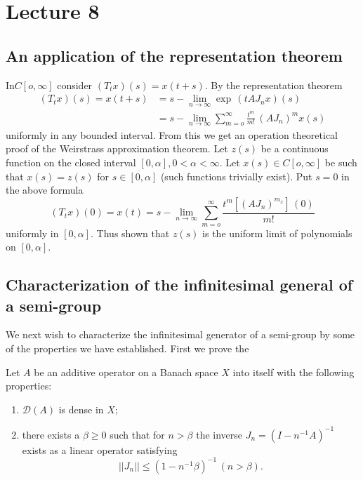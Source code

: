 \chapter{Lecture 8}\label{chap8} %

\section{An application of the representation theorem}\label{chap8:sec1}

In\pageoriginale $C[o, \infty]$ consider $(T_t x)(s)=x(t+s)$. By the representation
theorem 
\begin{align*}
 (T_t x) (s)= x(t+s) &= s-\lim_{n \to \infty} \exp \,(t A J_nx) (s)\\
 & =s-\lim_ {n \to \infty} \sum_{m =o}^\infty \frac{t^m}{m!} \,(A J_n)^m x(s)
\end{align*}
uniformly in any bounded interval. From this we get an operation
theoretical proof of the Weirstrass approximation theorem. Let $z(s)$
be a continuous function on the closed interval $[0, \alpha ],0 <
\alpha < \infty$. Let $x(s) \in C[o, \infty]$ be such that
$x(s)=z(s)$ for $s \in [0, \alpha]$ (such functions trivially
exist). Put $s=0$ in the above formula 
$$
(T_t x) (0)=x(t) = s-\lim_{n \to \infty} \sum_{m=o}^\infty \frac{t^m
 \left[(AJ_n)^{m_x}\right]\,(0)}{m!} 
$$
uniformly in $[0, \alpha]$. Thus shown that $z(s)$ is the uniform
limit of polynomials on $[0, \alpha]$. 

\section[Characterization of the...]{Characterization of the infinitesimal general of a
  semi-group}\label{chap8:sec2} 

We next wish to characterize the infinitesimal generator of a
semi-group by some of the properties we have established. First we
prove the 

\begin{prop*}%
 Let $A$ be an additive operator on a Banach space $X$ into itself
 with the following properties: 
 \begin{enumerate}[\rm (a)]
 \item $\mathscr{D}(A)$ is dense in $X$;
 \item there exists a $\beta \ge 0$ such that for $n > \beta$ the
  inverse $J_n=(I-n^{-1} A)^{-1}$ exists as a linear operator
  satisfying 
  $$
  ||J_n|| \le (1-n^{-1}\beta)^{-1}\,(n > \beta).
  $$
 \end{enumerate}
\end{prop*}

